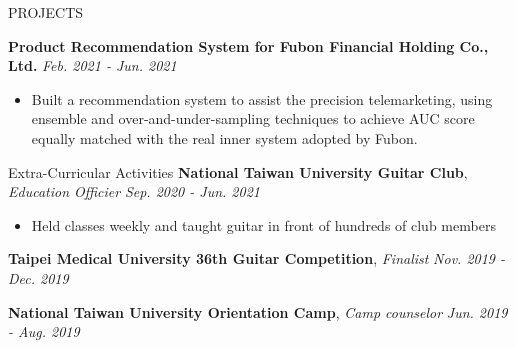 \documentclass{resume} %
\begin{document}
\begin{rSection}{PROJECTS}
\item \textbf{Product Recommendation System for Fubon Financial Holding Co., Ltd.} \hfill \textit{Feb. 2021 - Jun. 2021}
\begin{itemize}
    \itemsep -3pt
    \item Built a recommendation system to assist the precision telemarketing, using ensemble and over-and-under-sampling techniques to achieve AUC score equally matched with the real inner system adopted by Fubon.
\end{itemize}




\end{rSection} 

\begin{rSection}{Extra-Curricular Activities} 
\textbf{National Taiwan University Guitar Club}, \textit{Education Officier} \hfill \textit{Sep. 2020 - Jun. 2021}
\begin{itemize}
    \item Held classes weekly and taught guitar in front of hundreds of club members
\end{itemize}

\textbf{Taipei Medical University 36th Guitar Competition}, \textit{Finalist}  \hfill \textit{Nov. 2019 - Dec. 2019} 


\textbf{National Taiwan University Orientation Camp}, \textit{Camp counselor}  \hfill \textit{Jun. 2019 - Aug. 2019} 



\end{rSection}

\end{document}
